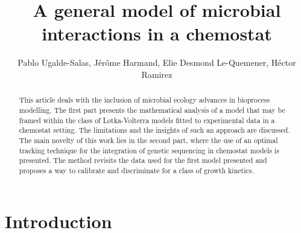\documentclass[3p,times]{elsarticle}
\begin{document}
\begin{frontmatter}



\dochead{}

\title{A general model of microbial interactions in a chemostat}


\author{Pablo Ugalde-Salas, Jérôme Harmand, Elie Desmond Le-Quemener, Héctor Ramirez}

\address{}

\begin{abstract}
	This article deals with the inclusion of microbial ecology advances in bioprocess modelling. The first part presents the mathematical analysis of a model that may be framed within the class of Lotka-Volterra models fitted to experimental data in a chemostat setting. The limitations and the insights of such an approach are discussed. The main novelty of this work lies in the second part, where the use of an optimal tracking technique for the integration of genetic sequencing in chemostat models is presented. The method revisits the data used for the first model presented and proposes a way to calibrate and discriminate for a class of growth kinetics. 
\end{abstract}

\end{frontmatter}

\section{Introduction}
\end{document}
